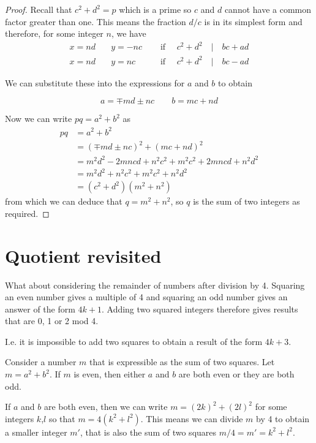 \documentclass[11pt]{amsart}
\begin{document}
\begin{proof}
Recall that $c^2 + d^2 = p$ which is a prime so $c$ and $d$ cannot have a common factor greater than one.  This means the fraction $d/c$ is in its simplest form and therefore, for some integer $n$, we have
$$
\begin{aligned}
x = nd \quad & y = - n c & \quad \text{ if } \quad
 c^2 + d^2 \quad | \quad bc + ad
\\
x = nd \quad & y =  n c & \quad \text{ if } \quad
c^2 + d^2 \quad | \quad bc - ad
\end{aligned}
$$

We can substitute these into the expressions for $a$ and $b$ to obtain

$$
 a = \mp md \pm nc  \qquad b = mc + nd
$$

Now we can write $pq = a^2 + b^2$ as
$$
\begin{aligned}
pq &= a^2 + b^2 \\
&=
(\mp md \pm nc)^2  +  (mc + nd)^2 
\\
&= 
m^2 d^2 - 2 mncd + n^2 c^2 + m^2 c^2 + 2 mncd + n^2 d^2
\\
&= 
m^2 d^2 + n^2 c^2 + m^2 c^2  + n^2 d^2
\\
&= 
( c^2 + d^2 ) (m^2 + n^2) 
\end{aligned}
$$
from which we can deduce that $q = m^2 + n^2$, so $q$ is the sum of two integers as required.

\end{proof}

\section{Quotient revisited}

What about considering the remainder of numbers after division by 4. Squaring an even number gives a multiple of 4 and squaring an odd number gives an answer of the form $4k+1$. Adding two squared integers therefore gives results that are 0, 1 or 2 mod 4.

I.e. it is impossible to add two squares to obtain a result of the form $4 k + 3$.

\vspace{1em}

Consider a number $m$ that is expressible as the sum of two squares. Let $m = a^2 + b^2$. If $m$ is even, then either $a$ and $b$ are both even or they are both odd.

If $a$ and $b$ are both even, then we can write $m = (2k)^2 + (2l)^2$ 
for some integers $k$,$l$ so that $m = 4 (k^2 + l^2)$. This means we can divide $m$ by 4 to obtain a smaller integer $m'$, that is also the sum of two squares $m/4 = m' = k^2 + l^2$.
\end{document}
